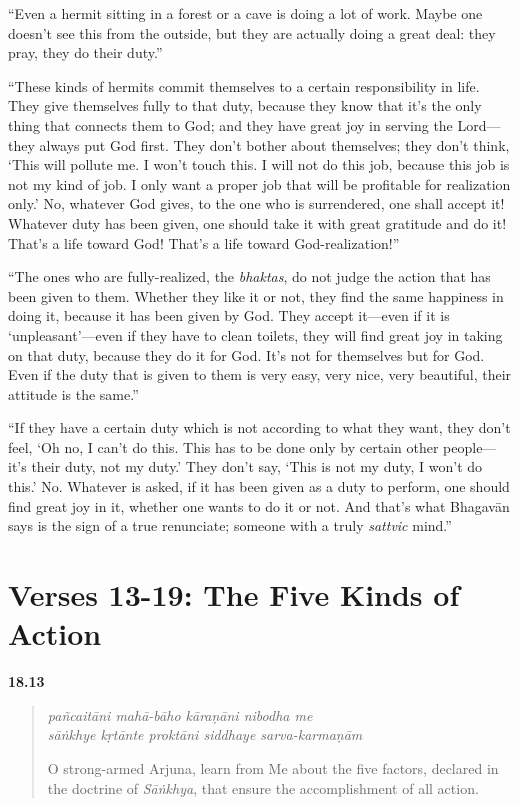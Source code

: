 \enquote{Even a hermit sitting in a forest or a cave is doing a lot of work. Maybe one doesn’t see this from the outside, but they are actually doing a great deal: they pray, they do their duty.}

\enquote{These kinds of hermits commit themselves to a certain responsibility in life. They give themselves fully to that duty, because they know that it’s the only thing that connects them to God; and they have great joy in serving the Lord---they always put God first. They don’t bother about themselves; they don’t think, \enquote{This will pollute me. I won’t touch this. I will not do this job, because this job is not my kind of job. I only want a proper job that will be profitable for realization only.} No, whatever God gives, to the one who is surrendered, one shall accept it! Whatever duty has been given, one should take it with great gratitude and do it! That’s a life toward God! That’s a life toward God-realization!}

\enquote{The ones who are fully-realized, the \textit{bhaktas}, do not judge the action that has been given to them. Whether they like it or not, they find the same happiness in doing it, because it has been given by God. They accept it---even if it is \enquote{unpleasant}---even if they have to clean toilets, they will find great joy in taking on that duty, because they do it for God. It’s not for themselves but for God. Even if the duty that is given to them is very easy, very nice, very beautiful, their attitude is the same.}

\enquote{If they have a certain duty which is not according to what they want, they don’t feel, \enquote{Oh no, I can’t do this. This has to be done only by certain other people---it’s their duty, not my duty.} They don’t say, \enquote{This is not my duty, I won’t do this.} No. Whatever is asked, if it has been given as a duty to perform, one should find great joy in it, whether one wants to do it or not. And that’s what Bhagavān says is the sign of a true renunciate; someone with a truly \textit{sattvic} mind.}

\section{Verses 13-19: The Five Kinds of Action}\label{sec-verses-13-19-the-five-kinds-of-action}


\par\noindent\textbf{18.13}\par
\begin{verse}
\textit{pañcaitāni mahā-bāho kāraṇāni nibodha me} \\
\textit{sāṅkhye kṛtānte proktāni siddhaye sarva-karmaṇām}

\noindent O strong-armed Arjuna, learn from Me about the five factors, declared in the doctrine of \textit{Sāṅkhya}, that ensure the accomplishment of all action.
\end{verse}
\par



